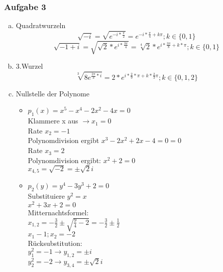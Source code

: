 \subsubsection{Aufgabe 3}	

	\begin{enumerate}[a)]
	
		\item Quadratwurzeln
		\[\sqrt{-i} = \sqrt{e^{-i*\frac{\pi}{2}}} = e^{-i*\frac{\pi}{4}+k\pi};k \in \{0,1\}\]\newline
		\[\sqrt{-1+i} = \sqrt{\sqrt{2}*e^{i*\frac{3\pi}{4}}} = \sqrt[4]{2}*e^{i*\frac{3\pi}{8}+k*\pi};k \in \{0,1\}\]\newline	
		\item 3.Wurzel
		\[\sqrt[3]{8e^{\frac{2\pi}{3}*i}} = 2*e^{i*\frac{2}{9}*\pi+k*\frac{2}{3}\pi};k\in \{0,1,2\}\]
		\item Nullstelle der Polynome
		\begin{itemize}
			\item $p_{1}(x) = x^5-x^4-2x^2-4x=0$\\
			Klammere x aus $\rightarrow x_{1} = 0$\\[2ex]
			Rate $x_{2}=-1$\\
			Polynomdivision ergibt $x^3-2x^2+2x-4=0=0$\\[2ex]
			Rate $x_{3}=2$\\
			Polynomdivision ergibt: $x^2+2=0$\\
			$x_{4,5}=\sqrt{-2}=\pm\sqrt{2}i$
			\item $p_{2}(y) = y^4-3y^3+2=0$\\[2ex]
			Substituiere $y^2 = x$\\
			$x^2+3x+2=0$\\[2ex]
			Mitternachtsformel:\\
			$x_{1,2} = -\frac{3}{2}\pm\sqrt{\frac{9}{4}-2}=-\frac{3}{2}\pm\frac{1}{2}$\\
			$x_{1}-1;x_{2}=-2$\\[2ex]
			R\"ucksubstitution:\\
			$y_{1}^2 = -1 \rightarrow y_{1,2}=\pm i$\\
			$y_{2}^2 = -2 \rightarrow y_{3,4}=\pm\sqrt{2}i$
		\end{itemize}
	\end{enumerate}
	